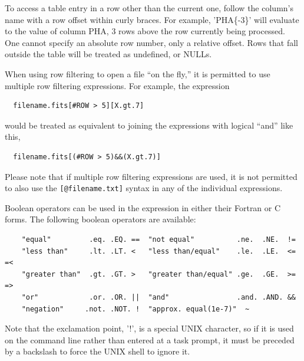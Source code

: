 \documentclass[11pt]{book}
\begin{document}
    To access a table entry in a row other  than the current one, follow
    the  column's name  with  a row  offset  within  curly  braces.  For
    example, 'PHA\{-3\}' will evaluate to the value  of column PHA, 3 rows
    above  the  row currently  being processed.   One  cannot specify an
    absolute row number, only a relative offset.  Rows that fall outside
    the table will be treated as undefined, or NULLs.

    When using row filtering to open a file ``on the fly,'' it is permitted
    to use multiple row filtering expressions.  For example, the expression
\begin{verbatim}
  filename.fits[#ROW > 5][X.gt.7]
\end{verbatim}
would be treated as equivalent to joining the expressions with logical ``and''
like this,
\begin{verbatim}
  filename.fits[(#ROW > 5)&&(X.gt.7)]
\end{verbatim}
Please note that if multiple row filtering expressions are used, it is
not permitted to also use the \verb+[@filename.txt]+ syntax in any
of the individual expressions.



    Boolean   operators can be  used in  the expression  in either their
    Fortran or C forms.  The following boolean operators are available:

\begin{verbatim}
    "equal"         .eq. .EQ. ==  "not equal"          .ne.  .NE.  !=
    "less than"     .lt. .LT. <   "less than/equal"    .le.  .LE.  <= =<
    "greater than"  .gt. .GT. >   "greater than/equal" .ge.  .GE.  >= =>
    "or"            .or. .OR. ||  "and"                .and. .AND. &&
    "negation"     .not. .NOT. !  "approx. equal(1e-7)"  ~
\end{verbatim}

Note that the exclamation point, '!', is a special UNIX character, so
if it is used on the command line rather than entered at a task
prompt, it must be preceded by a backslash to force the UNIX shell to
ignore it.
\end{document}
